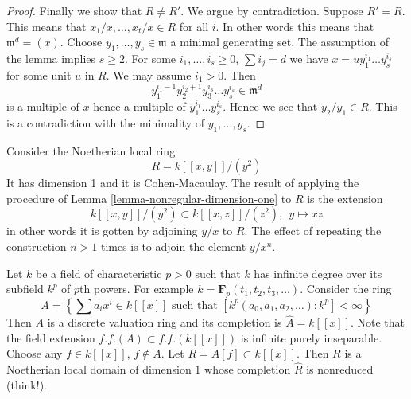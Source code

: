 \begin{proof}
\medskip\noindent
Finally we show that $R \not = R'$.
We argue by contradiction. Suppose $R' = R$. This means that
$x_1/x, \ldots, x_t/x \in R$ for all $i$. In other words this means
that $\mathfrak m^d = (x)$.
Choose $y_1, \ldots, y_s \in \mathfrak m$ a minimal generating set.
The assumption of the lemma implies $s \geq 2$.
For some $i_1, \ldots, i_s \geq 0$, $\sum i_j = d$ we have
$x = u y_1^{i_1} \ldots y_s^{i_s}$ for some unit $u$ in $R$.
We may assume $i_1 > 0$. Then
$$
y_1^{i_1 - 1} y_2^{i_2 + 1} y_3^{i_3} \ldots y_s^{i_s} \in \mathfrak m^d
$$
is a multiple of $x$ hence a multiple of $y_1^{i_1} \ldots y_s^{i_s}$.
Hence we see that $y_2/y_1 \in R$. This is a contradiction with
the minimality of $y_1, \ldots, y_s$.
\end{proof}

\begin{example}
\label{example-nonreduced}
Consider the Noetherian local ring
$$
R = k[[x, y]]/(y^2)
$$
It has dimension 1 and it is Cohen-Macaulay.
The result of applying the procedure of
Lemma \ref{lemma-nonregular-dimension-one} to $R$
is the extension
$$
k[[x, y]]/(y^2) \subset k[[x, z]]/(z^2), \ \ y \mapsto xz
$$
in other words it is gotten by adjoining $y/x$ to $R$. The
effect of repeating the construction $n > 1$ times is
to adjoin the element $y/x^n$.
\end{example}

\begin{example}
\label{example-bad-dvr-char-p}
Let $k$ be a field of characteristic $p > 0$ such that $k$
has infinite degree over its subfield $k^p$ of $p$th powers.
For example $k = \mathbf{F}_p(t_1, t_2, t_3, \ldots)$.
Consider the ring
$$
A =
\left\{
\sum a_i x^i \in k[[x]] \text{ such that }
[k^p(a_0, a_1, a_2, \ldots) : k^p] < \infty
\right\}
$$
Then $A$ is a discrete valuation ring and its completion is
$\hat A = k[[x]]$. Note that the field extension $f.f.(A) \subset
f.f.(k[[x]])$ is infinite purely inseparable.
Choose any $f \in k[[x]]$, $f \not \in A$. Let $R = A[f] \subset k[[x]]$.
Then $R$ is a Noetherian local domain of dimension $1$ whose
completion $\hat R$ is nonreduced (think!).
\end{example}

